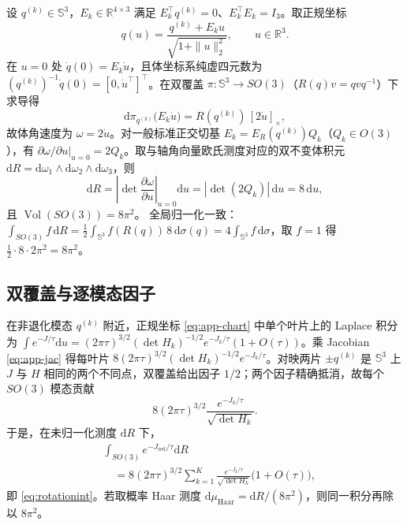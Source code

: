 设 $q^{(k)}\in\mathbb{S}^3$，$E_k\in\mathbb{R}^{4\times3}$ 满足 $E_k^\top q^{(k)}=0$、$E_k^\top E_k=I_3$。取正规坐标
\begin{equation}
q(u)=\frac{q^{(k)}+E_ku}{\sqrt{1+\|u\|_2^2}},\qquad u\in\mathbb{R}^3 .
\label{eq:app-chart}
\end{equation}
在 $u=0$ 处 $\dot q(0)=E_k\dot u$，且体坐标系纯虚四元数为 $(q^{(k)})^{-1}\dot q(0)=[0,\dot u^\top]^\top$。在双覆盖 $\pi:\mathbb{S}^3\to SO(3)$（$R(q)v=qvq^{-1}$）下求导得
\begin{equation}
\mathrm{d}\pi_{q^{(k)}}\big(E_k\dot u\big)=R(q^{(k)})\,[2\dot u]_\times ,
\label{eq:app-dpi}
\end{equation}
故体角速度为 $\omega=2\dot u$。对一般标准正交切基 $E_k=E_R(q^{(k)})Q_k$（$Q_k\in O(3)$），有 $\partial\omega/\partial u|_{u=0}=2Q_k$。取与轴角向量欧氏测度对应的双不变体积元 $\mathrm{d}R=\mathrm{d}\omega_1\wedge\mathrm{d}\omega_2\wedge\mathrm{d}\omega_3$，则
\begin{equation}
\mathrm{d}R=\left|\det\frac{\partial\omega}{\partial u}\right|_{u=0}\mathrm{d}u
=|\det(2Q_k)|\,\mathrm{d}u=8\,\mathrm{d}u,
\label{eq:app-jac}
\end{equation}
且 $\operatorname{Vol}(SO(3))=8\pi^2$。
全局归一化一致：$\int_{SO(3)}f\,\mathrm{d}R=\frac12\int_{\mathbb{S}^3}f(R(q))\,8\,\mathrm{d}\sigma(q)=4\int_{\mathbb{S}^3}f\,\mathrm{d}\sigma$，取 $f=1$ 得 $\frac12\cdot8\cdot2\pi^2=8\pi^2$。

\subsection*{双覆盖与逐模态因子}

在非退化模态 $q^{(k)}$ 附近，正规坐标 \eqref{eq:app-chart} 中单个叶片上的 Laplace 积分为 $\int e^{-J/\tau}\mathrm{d}u=(2\pi\tau)^{3/2}(\det H_k)^{-1/2}e^{-J_k/\tau}(1+O(\tau))$。乘 Jacobian \eqref{eq:app-jac} 得每叶片 $8(2\pi\tau)^{3/2}(\det H_k)^{-1/2}e^{-J_k/\tau}$。对映两片 $\pm q^{(k)}$ 是 $\mathbb{S}^3$ 上 $J$ 与 $H$ 相同的两个不同点，双覆盖给出因子 $1/2$；两个因子精确抵消，故每个 $SO(3)$ 模态贡献
\begin{equation}
8(2\pi\tau)^{3/2}\frac{e^{-J_k/\tau}}{\sqrt{\det H_k}} .
\label{eq:app-permode}
\end{equation}
于是，在未归一化测度 $\mathrm{d}R$ 下，
\begin{equation}
\begin{split}
&\int_{SO(3)}e^{-J_{\mathrm{red}}/\tau}\mathrm{d}R\\
&\quad=8(2\pi\tau)^{3/2}\sum_{k=1}^K\frac{e^{-J_k/\tau}}{\sqrt{\det H_k}}\big(1+O(\tau)\big),
\end{split}
\label{eq:app-rotint}
\end{equation}
即 \eqref{eq:rotationint}。若取概率 Haar 测度 $\mathrm{d}\mu_{\mathrm{Haar}}=\mathrm{d}R/(8\pi^2)$，则同一积分再除以 $8\pi^2$。

